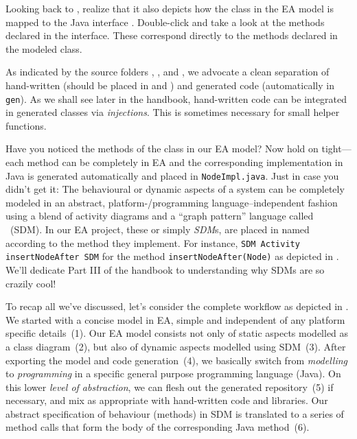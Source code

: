 Looking back to , realize that it also depicts how the class  in the EA model is mapped to the Java interface .
Double-click  and take a look at the methods declared in the interface. These correspond directly to the methods declared in the modeled  class.

As indicated by the source folders , , and , we advocate a clean separation of hand-written (should be placed in  and ) and generated code (automatically in \texttt{gen}).
As we shall see later in the handbook, hand-written code can be
integrated in generated classes via \emph{injections}.
This is sometimes necessary for small helper functions.

Have you noticed the methods of the  class in our EA model? 
Now hold on tight---each method can be  completely in EA and the corresponding implementation in Java is generated automatically and placed in \texttt{NodeImpl.java}.
Just in case you didn't get it: The behavioural or dynamic aspects of a system can be completely modeled in an abstract, platform-/programming language--independent fashion using a blend of activity diagrams and a \enquote{graph pattern} language called ~(SDM).
In our EA project, these  or simply \emph{SDM}s, are placed in  named according to the method they implement.
For instance, \texttt{\guillemotleft{}SDM Activity\guillemotright{} insertNodeAfter SDM} for the method \texttt{in\-sert\-NodeAft\-er(Node)} as depicted in .
We'll dedicate Part III of the handbook to understanding why SDMs are so  {\huge crazily} cool!

To recap all we've discussed, let's consider the complete workflow as depicted in . We started with a concise model in EA, simple and
independent of any platform specific details~(1).  Our EA model consists not only of static aspects modelled as a class diagram~(2), but also of dynamic aspects
modelled using SDM~(3).  After exporting the model and code generation~(4), we basically switch from \emph{modelling} to \emph{programming} in a specific
general purpose programming language (Java). On this lower \emph{level of abstraction}, we can flesh out the generated repository~(5) if necessary, and mix as
appropriate with hand-written code and libraries.  Our abstract specification of behaviour (methods) in SDM is translated to a series of method calls that form
the body of the corresponding Java method~(6).

